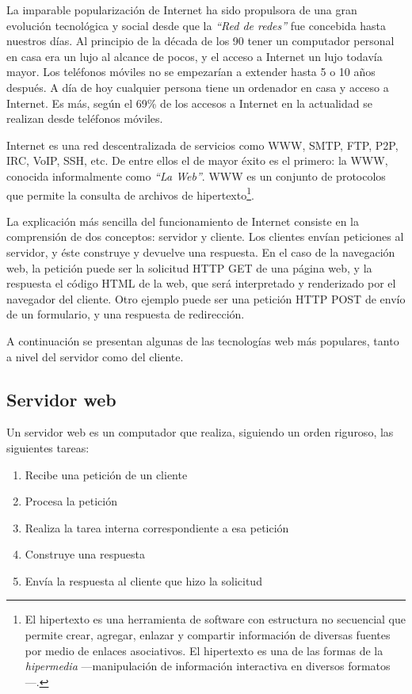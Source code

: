 La imparable popularización de Internet ha sido propulsora de una gran evolución tecnológica y social desde que la {\it ``Red de redes''} fue concebida hasta nuestros días. Al principio de la década de los 90 tener un computador personal en casa era un lujo al alcance de pocos, y el acceso a Internet un lujo todavía mayor. Los teléfonos móviles no se empezarían a extender hasta 5 o 10 años después. A día de hoy cualquier persona tiene un ordenador en casa y acceso a Internet. Es más, según \cite{Accenture2012} el 69\% de los accesos a Internet en la actualidad se realizan desde teléfonos móviles.

Internet es una red descentralizada de servicios como \acs{WWW}, \acs{SMTP}, \acs{FTP}, \acs{P2P}, \acs{IRC}, \acs{VoIP}, \acs{SSH}, etc. De entre ellos el de mayor éxito es el primero: la \acf{WWW}, conocida informalmente como {\it ``La Web''}. \acs{WWW} es un conjunto de protocolos que permite la consulta de archivos de hipertexto\footnote{El hipertexto es una herramienta de software con estructura no secuencial que permite crear, agregar, enlazar y compartir información de diversas fuentes por medio de enlaces asociativos. El hipertexto es una de las formas de la {\it hipermedia} ---manipulación de información interactiva en diversos formatos---.}.

La explicación más sencilla del funcionamiento de Internet consiste en la comprensión de dos conceptos: servidor y cliente. Los clientes envían peticiones al servidor, y éste construye y devuelve una respuesta. En el caso de la navegación web, la petición puede ser la solicitud \acs{HTTP} \acs{GET} de una página web, y la respuesta el código \acs{HTML} de la web, que será interpretado y renderizado por el navegador del cliente. Otro ejemplo puede ser una petición \acs{HTTP} \acs{POST} de envío de un formulario, y una respuesta de redirección.

A continuación se presentan algunas de las tecnologías web más populares, tanto a nivel del servidor como del cliente.

\subsection{Servidor web}

Un servidor web es un computador que realiza, siguiendo un orden riguroso, las siguientes tareas:

\begin{enumerate}
\item Recibe una petición de un cliente
\item Procesa la petición
\item Realiza la tarea interna correspondiente a esa petición
\item Construye una respuesta
\item Envía la respuesta al cliente que hizo la solicitud
\end{enumerate}

